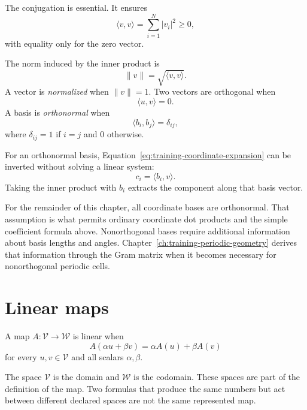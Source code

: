 The conjugation is essential. It ensures
\begin{equation}
  \langle v,v\rangle
  =\sum_{i=1}^{N}|v_i|^2\geq0,
\end{equation}
with equality only for the zero vector.

The norm induced by the inner product is
\begin{equation}
  \|v\|=\sqrt{\langle v,v\rangle}.
\end{equation}
A vector is \emph{normalized} when \(\|v\|=1\). Two vectors are orthogonal when
\begin{equation}
  \langle u,v\rangle=0.
\end{equation}
A basis is \emph{orthonormal} when
\begin{equation}
  \langle b_i,b_j\rangle=\delta_{ij},
\end{equation}
where \(\delta_{ij}=1\) if \(i=j\) and \(0\) otherwise.

For an orthonormal basis, Equation~\eqref{eq:training-coordinate-expansion} can
be inverted without solving a linear system:
\begin{equation}
  c_i=\langle b_i,v\rangle.
  \label{eq:training-orthonormal-coordinate}
\end{equation}
Taking the inner product with \(b_i\) extracts the component along that basis
vector.

For the remainder of this chapter, all coordinate bases are orthonormal. That
assumption is what permits ordinary coordinate dot products and the simple
coefficient formula above. Nonorthogonal bases require additional information
about basis lengths and angles. Chapter~\ref{ch:training-periodic-geometry}
derives that information through the Gram matrix when it becomes necessary for
nonorthogonal periodic cells.

\section{Linear maps}

\begin{definition}
A map \(A:\mathcal V\rightarrow\mathcal W\) is linear when
\begin{equation}
  A(\alpha u+\beta v)
  =\alpha A(u)+\beta A(v)
\end{equation}
for every \(u,v\in\mathcal V\) and all scalars \(\alpha,\beta\).
\end{definition}

The space \(\mathcal V\) is the domain and \(\mathcal W\) is the codomain.
These spaces are part of the definition of the map. Two formulas that produce
the same numbers but act between different declared spaces are not the same
represented map.

